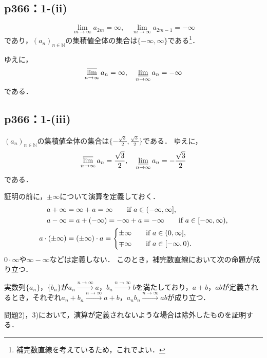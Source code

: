 \documentclass[uplatex,dvipdfmx,a4paper,10pt,fleqn]{jsarticle}
\begin{document}
\subsection*{p366：1-(ii)}

\begin{tleftbar}
    \[
        \lim_{m \to \infty} a_{2m} = \infty , \quad \lim_{m \to \infty} a_{2m-1} = -\infty
    \]
    であり，$(a_n)_{n \in \mathbb{N}}$の集積値全体の集合は$\{ -\infty , \infty \}$である\footnote{補完数直線を考えているため，これでよい．}．

    ゆえに，
    \[
        \varlimsup_{n \to \infty} a_n = \infty , \quad \varliminf_{n \to \infty} a_n =-\infty 
    \]
    である．
\end{tleftbar}

\subsection*{p366：1-(iii)}

\begin{tleftbar}
    $(a_n)_{n \in \mathbb{N}}$の集積値全体の集合は$\{ -\frac{\sqrt{3}}{2} , \frac{\sqrt{3}}{2} \}$である．
    ゆえに，
    \[
        \varlimsup_{n \to \infty} a_n = \frac{\sqrt{3}}{2} , \quad \varliminf_{n \to \infty} a_n =-\frac{\sqrt{3}}{2}
    \]
    である．
\end{tleftbar}

\newpage 


  証明の前に，$\pm \infty$について演算を定義しておく．
  \begin{align*}
    a + \infty &= \infty + a = \infty \qquad \text{if $a \in (-\infty,\infty]$}, \\
    a - \infty &= a + (-\infty) = -\infty + a = -\infty \qquad \text{if $a \in [-\infty,\infty)$}, \\
    a \cdot (\pm \infty) &= (\pm \infty) \cdot a =
    \begin{cases*}
      \pm \infty \quad & if $a \in (0,\infty]$, \\
      \mp \infty \quad & if $a \in [-\infty,0)$.
    \end{cases*}
  \end{align*}
  $0 \cdot \infty$や$\infty - \infty$などは定義しない．
  このとき，補完数直線において次の命題が成り立つ．
  \begin{lemm*}
    実数列$\{a_n\}$，$\{b_n\}$が$a_n \xrightarrow{n \to \infty} a$，$b_n \xrightarrow{n \to \infty} b$を満たしており，$a+b$，$ab$が定義されるとき，それぞれ$a_n + b_n \xrightarrow{n \to \infty} a+b$，$a_n b_n \xrightarrow{n \to \infty} ab$が成り立つ．
  \end{lemm*}
  問題2)，3)において，演算が定義されないような場合は除外したものを証明する．
  
\end{document}
